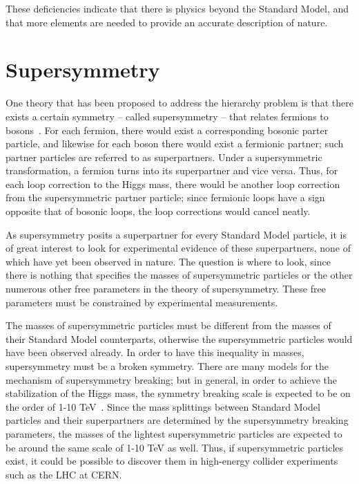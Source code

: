 These deficiencies indicate that there is physics beyond the Standard Model, and that more elements are needed to provide an accurate description of nature.

\section{Supersymmetry}

One theory that has been proposed to address the hierarchy problem is that there exists a certain symmetry -- called supersymmetry -- that relates fermions to bosons~\cite{Martin:1997ns}. For each fermion, there would exist a corresponding bosonic parter particle, and likewise for each boson there would exist a fermionic partner; such partner particles are referred to as superpartners. Under a supersymmetric transformation, a fermion turns into its superpartner and vice versa. Thus, for each loop correction to the Higgs mass, there would be another loop correction from the supersymmetric partner particle; since fermionic loops have a sign opposite that of bosonic loops, the loop corrections would cancel neatly.

As supersymmetry posits a superpartner for every Standard Model particle, it is of great interest to look for experimental evidence of these superpartners, none of which have yet been observed in nature. The question is where to look, since there is nothing that specifies the masses of supersymmetric particles or the other numerous other free parameters in the theory of supersymmetry. These free parameters must be constrained by experimental measurements.

The masses of supersymmetric particles must be different from the masses of their Standard Model counterparts, otherwise the supersymmetric particles would have been observed already. In order to have this inequality in masses, supersymmetry must be a broken symmetry. There are many models for the mechanism of supersymmetry breaking; but in general, in order to achieve the stabilization of the Higgs mass, the symmetry breaking scale is expected to be on the order of 1-10 TeV~\cite{Aitchison:2005cf}. Since the mass splittings between Standard Model particles and their superpartners are determined by the supersymmetry breaking parameters, the masses of the lightest supersymmetric particles are  expected to be around the same scale of 1-10 TeV as well. Thus, if supersymmetric particles exist, it could be possible to discover them in high-energy collider experiments such as the LHC at CERN.

